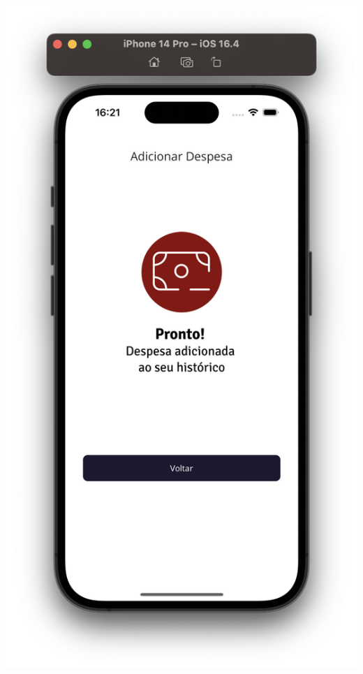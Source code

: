 \begin{center}
\begin{minipage}{0.4\textwidth}
            \label{fig:figura28}
        \end{minipage}%
        \begin{minipage}{0.4\textwidth}
            \centering
            \includegraphics[scale=0.2]{figs/figura29.png}
            \label{fig:figura29}
        \end{minipage}%
    \end{center}
    
